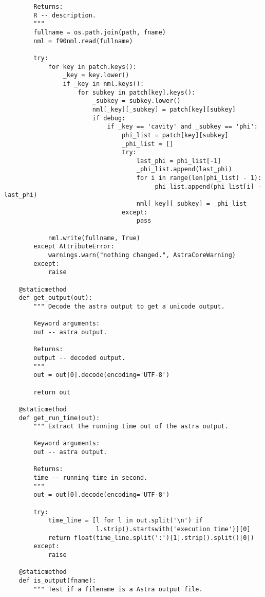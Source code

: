 \begin{footnotesize}
\begin{verbatim}
        Returns:
        R -- description.
        """
        fullname = os.path.join(path, fname)
        nml = f90nml.read(fullname)

        try:
            for key in patch.keys():
                _key = key.lower()
                if _key in nml.keys():
                    for subkey in patch[key].keys():
                        _subkey = subkey.lower()
                        nml[_key][_subkey] = patch[key][subkey]
                        if debug:
                            if _key == 'cavity' and _subkey == 'phi':
                                phi_list = patch[key][subkey]
                                _phi_list = []
                                try:
                                    last_phi = phi_list[-1]
                                    _phi_list.append(last_phi)
                                    for i in range(len(phi_list) - 1):
                                        _phi_list.append(phi_list[i] - last_phi)
                                    nml[_key][_subkey] = _phi_list
                                except:
                                    pass

            nml.write(fullname, True)
        except AttributeError:
            warnings.warn("nothing changed.", AstraCoreWarning)
        except:
            raise

    @staticmethod
    def get_output(out):
        """ Decode the astra output to get a unicode output.

        Keyword arguments:
        out -- astra output.

        Returns:
        output -- decoded output.
        """
        out = out[0].decode(encoding='UTF-8')

        return out

    @staticmethod
    def get_run_time(out):
        """ Extract the running time out of the astra output.

        Keyword arguments:
        out -- astra output.

        Returns:
        time -- running time in second.
        """
        out = out[0].decode(encoding='UTF-8')

        try:
            time_line = [l for l in out.split('\n') if
                         l.strip().startswith('execution time')][0]
            return float(time_line.split(':')[1].strip().split()[0])
        except:
            raise

    @staticmethod
    def is_output(fname):
        """ Test if a filename is a Astra output file.


\end{verbatim}
\end{footnotesize}
